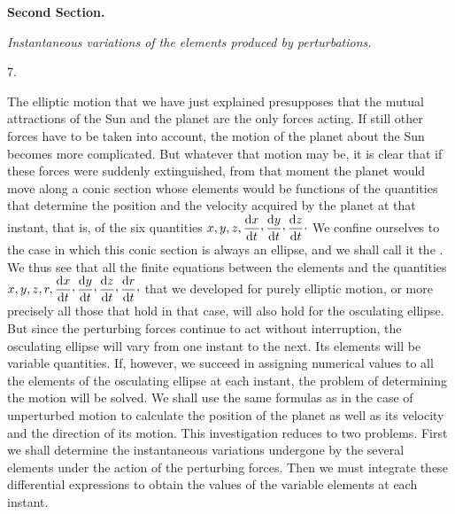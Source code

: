 \par{}\bigskip
{}
\begin{center}
{\large\bfseries Second Section.\par}
\medskip
\textit{Instantaneous variations of the elements produced by perturbations.}
\end{center}
\begin{center}7.\end{center}
\noindent\hspace*{\parindent}The elliptic motion that we have just explained presupposes that the mutual attractions of the Sun and the planet are the only forces acting. If still other forces have to be taken into account, the motion of the planet about the Sun becomes more complicated. But whatever that motion may be, it is clear that if these forces were suddenly extinguished, from that moment the planet would move along a conic section whose elements would be functions of the quantities that determine the position and the velocity acquired by the planet at that instant, that is, of the six quantities \(x,y,z,\dfrac{\mathrm{d}x}{\mathrm{d}t}\mathpunct{\raisebox{.45ex}{,}}\dfrac{\mathrm{d}y}{\mathrm{d}t}\mathpunct{\raisebox{.45ex}{,}}\dfrac{\mathrm{d}z}{\mathrm{d}t}\mathpunct{\cdot}\) We confine ourselves to the case in which this conic section is always an ellipse, and we shall call it the . We thus see that all the finite equations between the elements and the quantities \(x,y,z,r,\dfrac{\mathrm{d}x}{\mathrm{d}t}\mathpunct{\raisebox{.45ex}{,}}\dfrac{\mathrm{d}y}{\mathrm{d}t}\mathpunct{\raisebox{.45ex}{,}}\dfrac{\mathrm{d}z}{\mathrm{d}t}\mathpunct{\raisebox{.45ex}{,}}\dfrac{\mathrm{d}r}{\mathrm{d}t}\mathpunct{\raisebox{.45ex}{,}}\) that we developed for purely elliptic motion, or more precisely all those that hold in that case, will also hold for the osculating ellipse. But since the perturbing forces continue to act without interruption, the osculating ellipse will vary from one instant to the next. Its elements will be variable quantities. If, however, we succeed in assigning numerical values to all the elements of the osculating ellipse at each instant, the problem of determining the motion will be solved. We shall use the same formulas as in the case of unperturbed motion to calculate the position of the planet as well as its velocity and the direction of its motion. This investigation reduces to two problems. First we shall determine the instantaneous variations undergone by the several elements under the action of the perturbing forces. Then we must integrate these differential expressions to obtain the values of the variable elements at each instant.

